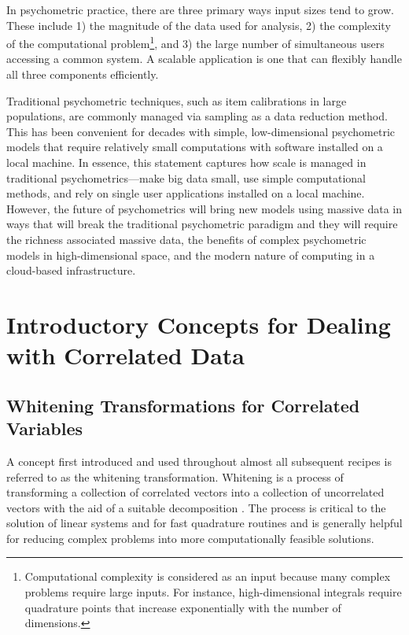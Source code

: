 \documentclass[12pt]{article}
\begin{document}
In psychometric practice, there are three primary ways input sizes tend to grow. These include 1) the magnitude of the data used for analysis, 2) the complexity of the computational problem\footnote{Computational complexity is considered as an input because many complex problems require large inputs. For instance, high-dimensional integrals require quadrature points that increase exponentially with the number of dimensions.}, and 3) the large number of simultaneous users accessing a common system. A scalable application is one that can flexibly handle all three components efficiently. 

Traditional psychometric techniques, such as item calibrations in large populations, are commonly managed via sampling as a data reduction method. This has been convenient for decades with simple, low-dimensional psychometric models that require relatively small computations with software installed on a local machine. In essence, this statement captures how scale is managed in traditional psychometrics---make big data small, use simple computational methods, and rely on single user applications installed on a local machine. However, the future of psychometrics will bring new models using massive data in ways that will break the traditional psychometric paradigm and they will require the richness associated massive data, the benefits of complex psychometric models in high-dimensional space, and the modern nature of computing in a cloud-based infrastructure.   

\section*{Introductory Concepts for Dealing with Correlated Data}

\subsection*{Whitening Transformations for Correlated Variables}

A concept first introduced and used throughout almost all subsequent recipes is referred to as the whitening transformation. Whitening is a process of transforming a collection of correlated vectors into a collection of uncorrelated vectors with the aid of a suitable decomposition \cite{whiten}. The process is critical to the solution of linear systems and for fast quadrature routines and is generally helpful for reducing complex problems into more computationally feasible solutions. 
\end{document}
